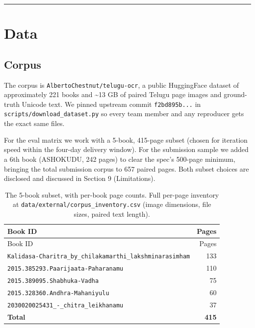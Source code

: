 \documentclass[
  letterpaper,
  DIV=11,
  numbers=noendperiod]{scrartcl}
\begin{document}
\begin{center}\rule{0.5\linewidth}{0.5pt}\end{center}

\section{Data}\label{data}

\subsection{Corpus}\label{corpus}

The corpus is \texttt{AlbertoChestnut/telugu-ocr}, a public HuggingFace
dataset of approximately 221 books and \textasciitilde13 GB of paired
Telugu page images and ground-truth Unicode text. We pinned upstream
commit \texttt{f2bd895b...} in \texttt{scripts/download\_dataset.py} so
every team member and any reproducer gets the exact same files.

For the eval matrix we work with a 5-book, 415-page subset (chosen for
iteration speed within the four-day delivery window). For the submission
sample we added a 6th book (ASHOKUDU, 242 pages) to clear the spec's
500-page minimum, bringing the total submission corpus to 657 paired
pages. Both subset choices are disclosed and discussed in Section 9
(Limitations).

\begin{longtable}[]{@{}lr@{}}
\caption{The 5-book subset, with per-book page counts. Full per-page
inventory at \protect\texttt{data/external/corpus\_inventory.csv} (image
dimensions, file sizes, paired text
length).}\label{tbl-corpus-inventory}\tabularnewline
\toprule\noalign{}
Book ID & Pages \\
\midrule\noalign{}
\endfirsthead
\toprule\noalign{}
Book ID & Pages \\
\midrule\noalign{}
\endhead
\bottomrule\noalign{}
\endlastfoot
\texttt{Kalidasa-Charitra\_by\_chilakamarthi\_lakshminarasimham} &
133 \\
\texttt{2015.385293.Paarijaata-Paharanamu} & 110 \\
\texttt{2015.389095.Shabhuka-Vadha} & 75 \\
\texttt{2015.328360.Andhra-Mahaniyulu} & 60 \\
\texttt{2030020025431\_-\_chitra\_leikhanamu} & 37 \\
\textbf{Total} & \textbf{415} \\
\end{longtable}
\end{document}
